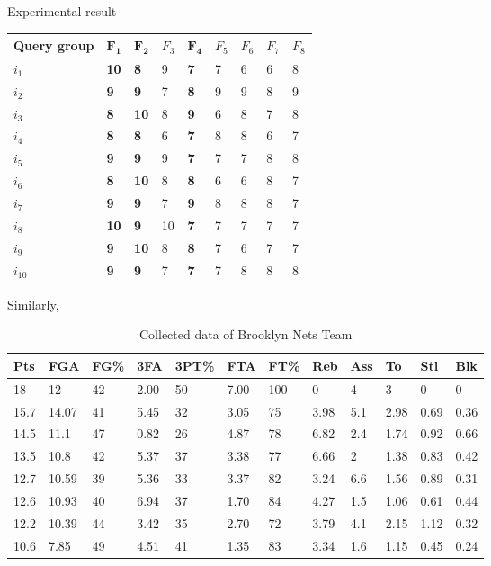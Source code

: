 \documentclass[
 size=14pt,
 paper=smartboard,  %
 mode=present, 		%
 display=slides, 	%
 style=tuliplab,  	%
 pauseslide,
 fleqn,leqno]{powerdot}
\begin{document}
\begin{slide}{Experimental result}
\begin{note}
\begin{table}
\begin{tabular}{p{2.8cm}p{0.9cm}p{0.9cm}p{0.9cm}p{0.9cm}p{0.9cm}p{0.9cm}p{0.9cm}p{0.9cm}}
\hline
  Query group  & $\mathbf{F_1}$ & $\mathbf{F_2}$ & $F_3$ & $\mathbf{F_4}$ & $F_5$ & $F_6$ & $F_7$ & $F_8$\\
\hline
  $i_1$   & \bf{10} & \bf{8}  & 9  & \bf{7}  & 7 & 6 & 6  & 8\\
  $i_2$   & \bf{9}  & \bf{9}  & 7  & \bf{8}  & 9 & 9 & 8  & 9\\
  $i_3$   & \bf{8}  & \bf{10} & 8  & \bf{9}  & 6 & 8 & 7  & 8\\
  $i_4$   & \bf{8}  & \bf{8}  & 6  & \bf{7}  & 8 & 8 & 6  & 7\\
  $i_5$   & \bf{9}  & \bf{9}  & 9  & \bf{7}  & 7 & 7 & 8  & 8\\
  $i_6$   & \bf{8}  & \bf{10} & 8  & \bf{8}  & 6 & 6 & 8  & 7\\
  $i_7$   & \bf{9}  & \bf{9}  & 7  & \bf{9}  & 8 & 8 & 8  & 7\\
  $i_8$   & \bf{10} & \bf{9}  & 10 & \bf{7}  & 7 & 7 & 7  & 7\\
  $i_9$   & \bf{9}  & \bf{10} & 8  & \bf{8}  & 7 & 6 & 7  & 7\\
  $i_{10}$& \bf{9}  & \bf{9}  & 7  & \bf{7}  & 7 & 8 & 8  & 8\\
\hline
\end{tabular}
\end{table}

Similarly,

\begin{table}[tb]
\setlength{\abovecaptionskip}{0pt}
\setlength{\belowcaptionskip}{10pt}
\centering
\caption{Collected data of Brooklyn Nets Team}

\begin{tabular}{p{0.9cm}p{0.9cm}p{0.9cm}p{0.9cm}p{0.9cm}p{0.9cm}p{0.9cm}p{0.9cm}p{0.9cm}p{0.9cm}p{0.9cm}p{0.9cm}}
\hline
  Pts & FGA & FG\% & 3FA & 3PT\% & FTA & FT\% & Reb & Ass & To & Stl & Blk \\
\hline
  18   & 12    & 42 &2.00 & 50 & 7.00 & 100& 0& 4& 3& 0& 0 \\
  15.7 & 14.07 & 41 &5.45 & 32 & 3.05 & 75 & 3.98& 5.1& 2.98& 0.69& 0.36\\
  14.5 & 11.1  & 47 &0.82 & 26 & 4.87 & 78 & 6.82& 2.4& 1.74& 0.92& 0.66 \\
  13.5 & 10.8  & 42 &5.37 & 37 & 3.38 & 77 & 6.66& 2& 1.38& 0.83& 0.42 \\
  12.7 & 10.59 & 39 &5.36 & 33 & 3.37 & 82 & 3.24& 6.6& 1.56& 0.89& 0.31 \\
  12.6 & 10.93 & 40 &6.94 & 37 & 1.70 & 84 & 4.27& 1.5& 1.06& 0.61& 0.44 \\
  12.2 & 10.39 & 44 &3.42 & 35 & 2.70 & 72 & 3.79& 4.1& 2.15& 1.12& 0.32 \\
  10.6 & 7.85  & 49 &4.51 & 41 & 1.35 & 83 & 3.34& 1.6& 1.15 & 0.45& 0.24 \\
\hline
\end{tabular}
\end{table}


\end{note}
\end{slide}
\end{document}
